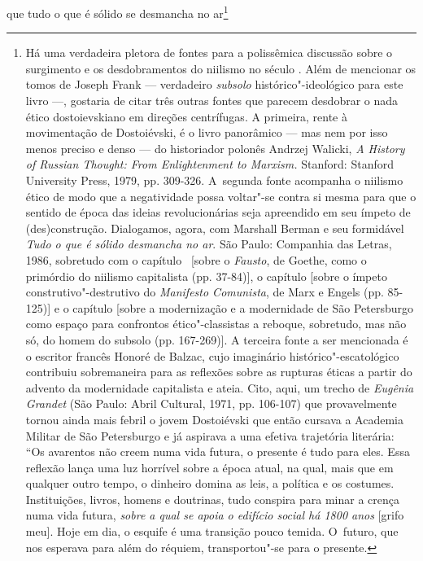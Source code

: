 que tudo o que é sólido se desmancha no ar\footnote{Há uma verdadeira
  pletora de fontes para a polissêmica discussão sobre o surgimento e os
  desdobramentos do niilismo no século . Além de mencionar os tomos
  de Joseph Frank --- verdadeiro \emph{subsolo} histórico"-ideológico para
  este livro ---, gostaria de citar três outras fontes que parecem
  desdobrar o nada ético dostoievskiano em direções centrífugas. A
  primeira, rente à movimentação de Dostoiévski, é o livro panorâmico ---
  mas nem por isso menos preciso e denso --- do historiador polonês
  Andrzej Walicki, \emph{A History of Russian Thought: From
  Enlightenment to Marxism.} Stanford: Stanford University Press, 1979,
  pp. 309-326. A~segunda fonte acompanha o niilismo ético de modo que a
  negatividade possa voltar"-se contra si mesma para que o sentido de
  época das ideias revolucionárias seja apreendido em seu ímpeto de
  (des)construção. Dialogamos, agora, com Marshall Berman e seu
  formidável \emph{Tudo o que é sólido desmancha no ar}. São Paulo:
  Companhia das Letras, 1986, sobretudo com o capítulo~ {[}sobre o
  \emph{Fausto}, de Goethe, como o primórdio do niilismo capitalista
  (pp. 37-84){]}, o capítulo  {[}sobre o ímpeto construtivo"-destrutivo
  do \emph{Manifesto Comunista}, de Marx e Engels (pp. 85-125){]} e o
  capítulo  {[}sobre a modernização e a modernidade de São
  Petersburgo como espaço para confrontos ético"-classistas a reboque,
  sobretudo, mas não só, do homem do subsolo (pp. 167-269){]}. A
  terceira fonte a ser mencionada é o escritor francês Honoré de Balzac,
  cujo imaginário histórico"-escatológico contribuiu sobremaneira para as
  reflexões sobre as rupturas éticas a partir do advento da modernidade
  capitalista e ateia. Cito, aqui, um trecho de \emph{Eugênia Grandet}
  (São Paulo: Abril Cultural, 1971, pp. 106-107) que provavelmente
  tornou ainda mais febril o jovem Dostoiévski que então cursava a
  Academia Militar de São Petersburgo e já aspirava a uma efetiva
  trajetória literária: ``Os avarentos não creem numa vida futura, o
  presente é tudo para eles. Essa reflexão lança uma luz horrível sobre
  a época atual, na qual, mais que em qualquer outro tempo, o dinheiro
  domina as leis, a política e os costumes. Instituições, livros, homens
  e doutrinas, tudo conspira para minar a crença numa vida futura,
  \emph{sobre a qual se apoia o edifício social há 1800 anos} {[}grifo
  meu{]}. Hoje em dia, o esquife é uma transição pouco temida. O~futuro,
  que nos esperava para além do réquiem, transportou"-se para o presente.
}

